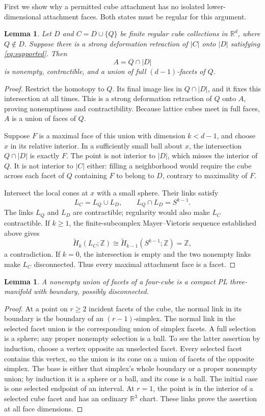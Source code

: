 \documentclass[11pt]{article}
\newtheorem{lemma}[theorem]{Lemma}
\theoremstyle{remark}
\newcommand{\Z}{\mathbb Z}
\newcommand{\R}{\mathbb R}
\newcommand{\Ht}{\widetilde H}
\begin{document}
First we show why a permitted cube attachment has no isolated lower-dimensional
attachment faces. Both states must be regular for this argument.

\begin{lemma}\label{lem:pure}
Let $D$ and $C=D\cup\{Q\}$ be finite regular cube collections in
$\R^d$, where $Q\notin D$. Suppose there is a strong deformation
retraction of $|C|$ onto $|D|$ satisfying \eqref{eq:supported}. Then
\[
 A=Q\cap|D|
\]
is nonempty, contractible, and a union of full $(d-1)$-facets of $Q$.
\end{lemma}

\begin{proof}
Restrict the homotopy to $Q$. Its final image lies in $Q\cap|D|$, and
it fixes this intersection at all times. This is a strong deformation
retraction of $Q$ onto $A$, proving nonemptiness and contractibility.
Because lattice cubes meet in full faces, $A$ is a union of faces of $Q$.

Suppose $F$ is a maximal face of this union with dimension $k<d-1$, and
choose $x$ in its relative interior. In a sufficiently small ball about
$x$, the intersection $Q\cap|D|$ is exactly $F$. The point is not interior
to $|D|$, which misses the interior of $Q$. It is not interior to $|C|$
either: filling a neighborhood would require the cube across each facet
of $Q$ containing $F$ to belong to $D$, contrary to maximality of $F$.

Intersect the local cones at $x$ with a small sphere. Their links satisfy
\[
 L_C=L_Q\cup L_D,\qquad L_Q\cap L_D=S^{k-1}.
\]
The links $L_Q$ and $L_D$ are contractible; regularity would also make
$L_C$ contractible. If $k\geq1$, the finite-subcomplex Mayer--Vietoris
sequence established above gives
\[
 \Ht_k(L_C;\Z)\cong\Ht_{k-1}(S^{k-1};\Z)=\Z,
\]
a contradiction. If $k=0$, the intersection is empty and the two nonempty
links make $L_C$ disconnected. Thus every maximal attachment face is a facet.
\end{proof}

\begin{lemma}\label{lem:facets}
A nonempty union of facets of a four-cube is a compact PL three-manifold
with boundary, possibly disconnected.
\end{lemma}

\begin{proof}
At a point on $r\geq2$ incident facets of the cube, the normal link in
its boundary is the boundary of an $(r-1)$-simplex. The normal link in
the selected facet union is the corresponding union of simplex facets.
A full selection is a sphere; any proper nonempty selection is a ball.
To see the latter assertion by induction, choose a vertex opposite an
unselected facet. Every selected facet contains this vertex, so the union
is its cone on a union of facets of the opposite simplex. The base is
either that simplex's whole boundary or a proper nonempty union; by
induction it is a sphere or a ball, and its cone is a ball. The initial
case is one selected endpoint of an interval. At $r=1$, the point is in
the interior of a selected cube facet and has an ordinary $\R^3$ chart.
These links prove the assertion at all face dimensions.
\end{proof}
\end{document}
